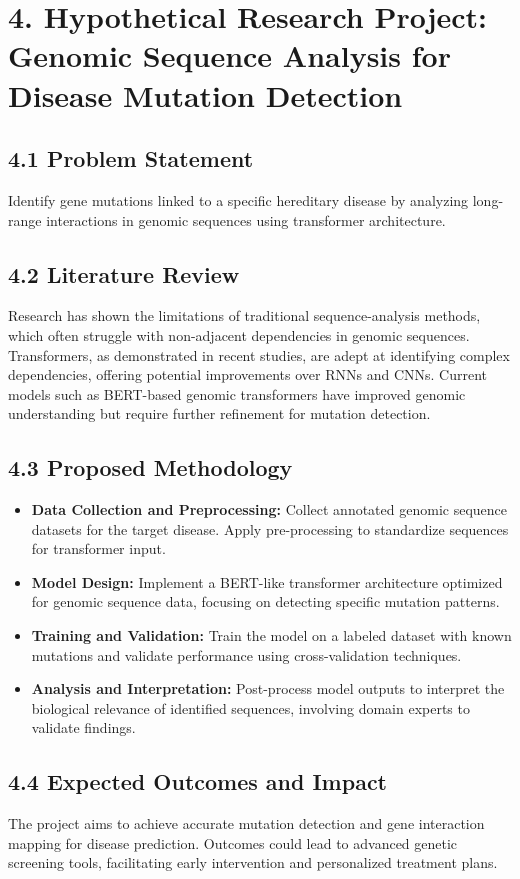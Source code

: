 \documentclass[12pt]{article}
\begin{document}
\section*{4. Hypothetical Research Project: Genomic Sequence Analysis for Disease Mutation Detection}

\subsection*{4.1 Problem Statement}
Identify gene mutations linked to a specific hereditary disease by analyzing long-range interactions in genomic sequences using transformer architecture.

\subsection*{4.2 Literature Review}
Research has shown the limitations of traditional sequence-analysis methods, which often struggle with non-adjacent dependencies in genomic sequences. Transformers, as demonstrated in recent studies, are adept at identifying complex dependencies, offering potential improvements over RNNs and CNNs. Current models such as BERT-based genomic transformers have improved genomic understanding but require further refinement for mutation detection.

\subsection*{4.3 Proposed Methodology}
\begin{itemize}
    \item \textbf{Data Collection and Preprocessing:} Collect annotated genomic sequence datasets for the target disease. Apply pre-processing to standardize sequences for transformer input.
    \item \textbf{Model Design:} Implement a BERT-like transformer architecture optimized for genomic sequence data, focusing on detecting specific mutation patterns.
    \item \textbf{Training and Validation:} Train the model on a labeled dataset with known mutations and validate performance using cross-validation techniques.
    \item \textbf{Analysis and Interpretation:} Post-process model outputs to interpret the biological relevance of identified sequences, involving domain experts to validate findings.
\end{itemize}

\subsection*{4.4 Expected Outcomes and Impact}
The project aims to achieve accurate mutation detection and gene interaction mapping for disease prediction. Outcomes could lead to advanced genetic screening tools, facilitating early intervention and personalized treatment plans.
\end{document}
